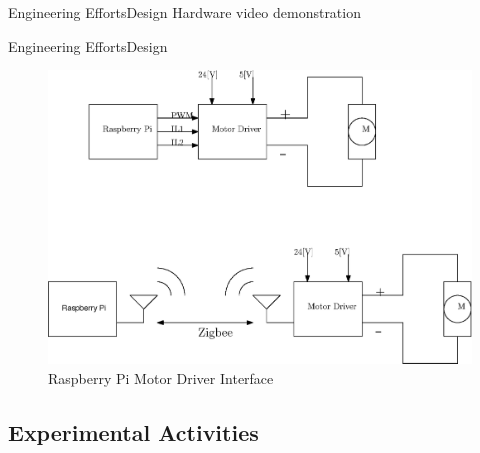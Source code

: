\documentclass{beamer}
\begin{document}
\begin{frame}{Engineering Efforts}{Design}
  Hardware video demonstration 
\end{frame}


\begin{frame}{Engineering Efforts}{Design}
  \begin{figure}
    \centering
    \includegraphics[scale=.5]{figs/ipe/RpiMDInterface.eps}
    \caption{Raspberry Pi Motor Driver Interface}
    \label{fig:RpiMDInterface}
\end{figure}
\end{frame}


\subsection{Experimental Activities}


\end{document}
